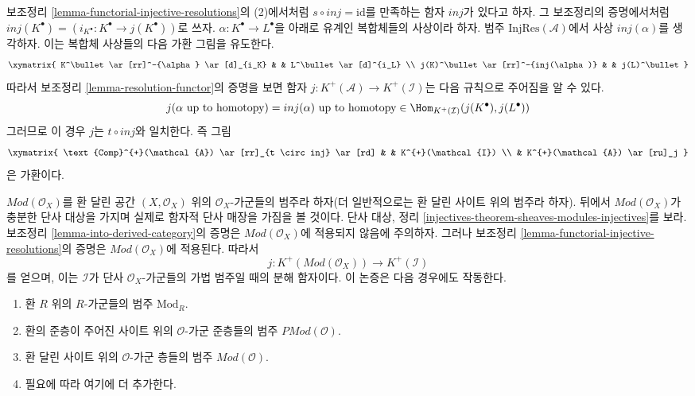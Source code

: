 \begin{remark}
\label{remark-match}
보조정리 \ref{lemma-functorial-injective-resolutions}의 (2)에서처럼
$s \circ inj = \text{id}$를 만족하는 함자 $inj$가 있다고 하자.
그 보조정리의 증명에서처럼
$inj(K^\bullet) = (i_{K^\bullet} : K^\bullet \to j(K^\bullet))$로 쓰자.
$\alpha : K^\bullet \to L^\bullet$을 아래로 유계인 복합체들의
사상이라 하자. 범주 $\text{InjRes}(\mathcal{A})$에서 사상
$inj(\alpha)$를 생각하자. 이는 복합체 사상들의 다음 가환 그림을
유도한다.
$$
\xymatrix{
K^\bullet
\ar[rr]^-{\alpha}
\ar[d]_{i_K} & &
L^\bullet \ar[d]^{i_L} \\
j(K)^\bullet
\ar[rr]^-{inj(\alpha)}
& &
j(L)^\bullet
}
$$
따라서 보조정리 \ref{lemma-resolution-functor}의 증명을 보면 함자
$j : K^{+}(\mathcal{A}) \to K^{+}(\mathcal{I})$는 다음 규칙으로
주어짐을 알 수 있다.
$$
j(\alpha\text{ up to homotopy}) = inj(\alpha)\text{ up to homotopy}\in
\Hom_{K^{+}(\mathcal{I})}(j(K^\bullet), j(L^\bullet))
$$
그러므로 이 경우 $j$는 $t \circ inj$와 일치한다. 즉 그림
$$
\xymatrix{
\text{Comp}^{+}(\mathcal{A}) \ar[rr]_{t \circ inj} \ar[rd] & &
K^{+}(\mathcal{I}) \\
& K^{+}(\mathcal{A}) \ar[ru]_j
}
$$
은 가환이다.
\end{remark}

\begin{remark}
\label{remark-big-abelian-category}
$\textit{Mod}(\mathcal{O}_X)$를 환 달린 공간 $(X, \mathcal{O}_X)$ 위의
$\mathcal{O}_X$-가군들의 범주라 하자(더 일반적으로는 환 달린 사이트
위의 범주라 하자). 뒤에서 $\textit{Mod}(\mathcal{O}_X)$가 충분한 단사
대상을 가지며 실제로 함자적 단사 매장을 가짐을 볼 것이다.
단사 대상, 정리
\ref{injectives-theorem-sheaves-modules-injectives}를 보라.
보조정리 \ref{lemma-into-derived-category}의 증명은
$\textit{Mod}(\mathcal{O}_X)$에 적용되지 않음에 주의하자. 그러나
보조정리 \ref{lemma-functorial-injective-resolutions}의 증명은
$\textit{Mod}(\mathcal{O}_X)$에 적용된다. 따라서
$$
j : K^{+}(\textit{Mod}(\mathcal{O}_X))
\longrightarrow
K^{+}(\mathcal{I})
$$
를 얻으며, 이는 $\mathcal{I}$가 단사 $\mathcal{O}_X$-가군들의 가법
범주일 때의 분해 함자이다. 이 논증은 다음 경우에도 작동한다.
\begin{enumerate}
\item 환 $R$ 위의 $R$-가군들의 범주 $\text{Mod}_R$.
\item 환의 준층이 주어진 사이트 위의 $\mathcal{O}$-가군 준층들의 범주
$\textit{PMod}(\mathcal{O})$.
\item 환 달린 사이트 위의 $\mathcal{O}$-가군 층들의 범주
$\textit{Mod}(\mathcal{O})$.
\item 필요에 따라 여기에 더 추가한다.
\end{enumerate}
\end{remark}

